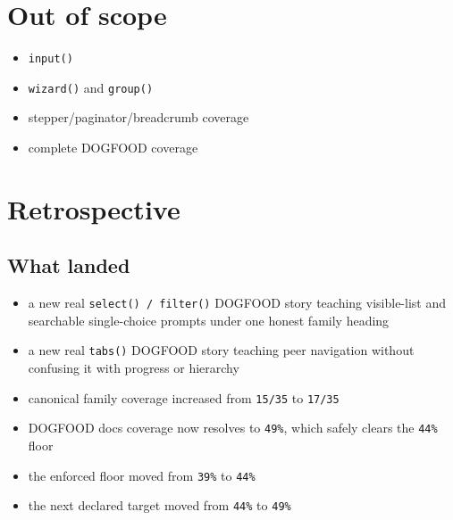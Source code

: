 \section{Out of scope}\label{record-072-out-of-scope}

\begin{itemize}
\tightlist
\item
  \texttt{i\allowbreak{}n\allowbreak{}p\allowbreak{}u\allowbreak{}t\allowbreak{}(\allowbreak{})}
\item
  \texttt{w\allowbreak{}i\allowbreak{}z\allowbreak{}a\allowbreak{}r\allowbreak{}d\allowbreak{}(\allowbreak{})} and \texttt{g\allowbreak{}r\allowbreak{}o\allowbreak{}u\allowbreak{}p\allowbreak{}(\allowbreak{})}
\item
  stepper/paginator/breadcrumb coverage
\item
  complete DOGFOOD coverage
\end{itemize}

\section{Retrospective}\label{record-072-retrospective}

\subsection{What landed}\label{record-072-what-landed}

\begin{itemize}
\tightlist
\item
  a new real \texttt{s\allowbreak{}e\allowbreak{}l\allowbreak{}e\allowbreak{}c\allowbreak{}t\allowbreak{}(\allowbreak{})\allowbreak{} \allowbreak{}/\allowbreak{} \allowbreak{}f\allowbreak{}i\allowbreak{}l\allowbreak{}t\allowbreak{}e\allowbreak{}r\allowbreak{}(\allowbreak{})} DOGFOOD story teaching visible-list and searchable single-choice prompts under one honest family heading
\item
  a new real \texttt{t\allowbreak{}a\allowbreak{}b\allowbreak{}s\allowbreak{}(\allowbreak{})} DOGFOOD story teaching peer navigation without confusing it with progress or hierarchy
\item
  canonical family coverage increased from \texttt{1\allowbreak{}5\allowbreak{}/\allowbreak{}3\allowbreak{}5} to \texttt{1\allowbreak{}7\allowbreak{}/\allowbreak{}3\allowbreak{}5}
\item
  DOGFOOD docs coverage now resolves to \texttt{4\allowbreak{}9\allowbreak{}\%}, which safely clears the \texttt{4\allowbreak{}4\allowbreak{}\%} floor
\item
  the enforced floor moved from \texttt{3\allowbreak{}9\allowbreak{}\%} to \texttt{4\allowbreak{}4\allowbreak{}\%}
\item
  the next declared target moved from \texttt{4\allowbreak{}4\allowbreak{}\%} to \texttt{4\allowbreak{}9\allowbreak{}\%}
\end{itemize}

